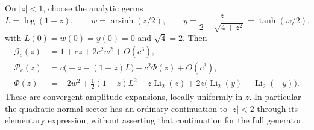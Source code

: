 \begin{theorem}\label{rmi:quadratic}
On $|z|<1$, choose the analytic germs
\[
 L=\log(1-z),\qquad w=\operatorname{arsinh}(z/2),\qquad
 y=\frac{z}{2+\sqrt{4+z^2}}=\tanh(w/2),
\]
with $L(0)=w(0)=y(0)=0$ and $\sqrt4=2$. Then
\begin{align}
 \mathcal G_c(z)&=1+cz+2c^2w^2+O(c^3),\label{rmi:normal}\\
 \mathcal P_c(z)&=c\bigl(-z-(1-z)L\bigr)+c^2\Phi(z)+O(c^3),
                                                    \label{rmi:primitive}\\
 \Phi(z)&=-2w^2+\tfrac12(1-z)L^2-z\operatorname{Li}_2(z)
              +2z\bigl(\operatorname{Li}_2(y)-\operatorname{Li}_2(-y)\bigr).
                                                    \label{rmi:dilog}
\end{align}
These are convergent amplitude expansions, locally uniformly in $z$.
In particular the quadratic normal sector has an ordinary continuation
to $|z|<2$ through its elementary expression, without asserting that
continuation for the full generator.
\end{theorem}

